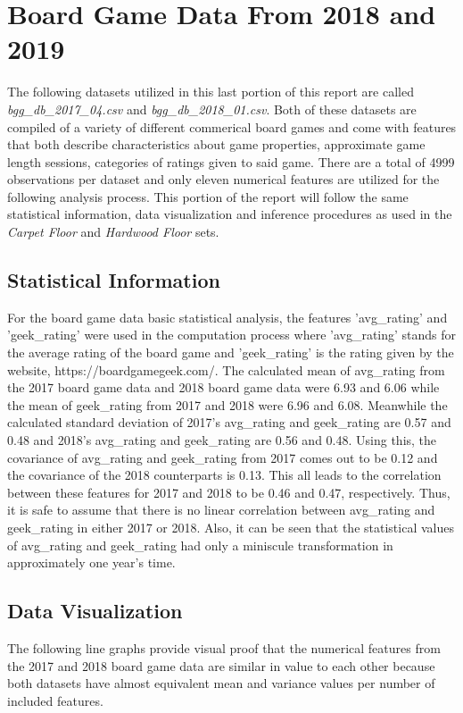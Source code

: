 \documentclass[a4paper,12pt]{IEEEtran}
\begin{document}
\section{Board Game Data From 2018 and 2019}
The following datasets utilized in this last portion of this report are called \textit{bgg\_db\_2017\_04.csv} and \textit{bgg\_db\_2018\_01.csv}. Both of these datasets are compiled of a variety of different commerical board games and come with features that both describe characteristics about game properties, approximate game length sessions, categories of ratings given to said game. There are a total of 4999 observations per dataset and only eleven numerical features are utilized for the following analysis process. This portion of the report will follow the same statistical information, data visualization and inference procedures as used in the \textit{Carpet Floor} and \textit{Hardwood Floor} sets.

\subsection{Statistical Information}
\label{sec5}
For the board game data basic statistical analysis, the features 'avg\_rating' and 'geek\_rating' were used in the computation process where 'avg\_rating' stands for the average rating of the board game and 'geek\_rating' is the rating given by the website, https://boardgamegeek.com/. The calculated mean of avg\_rating from the 2017 board game data and 2018 board game data were 6.93 and 6.06 while the mean of geek\_rating from 2017 and 2018 were 6.96 and 6.08. Meanwhile the calculated standard deviation of 2017's avg\_rating and geek\_rating are 0.57 and 0.48 and 2018's avg\_rating and geek\_rating are 0.56 and 0.48. Using this, the covariance of avg\_rating and geek\_rating from 2017 comes out to be 0.12 and the covariance of the 2018 counterparts is 0.13. This all leads to the correlation between these features for 2017 and 2018 to be 0.46 and 0.47, respectively. Thus, it is safe to assume that there is no linear correlation between avg\_rating and geek\_rating in either 2017 or 2018. Also, it can be seen that the statistical values of avg\_rating and geek\_rating had only a miniscule transformation in approximately one year's time.


\subsection{Data Visualization}
\label{sec6}
The following line graphs provide visual proof that the numerical features from the 2017 and 2018 board game data are similar in value to each other because both datasets have almost equivalent mean and variance values per number of included features.
\end{document}
